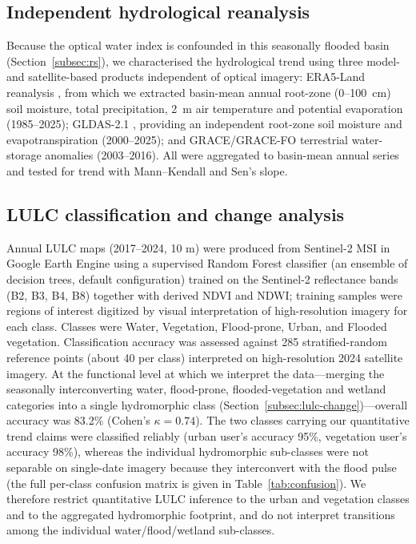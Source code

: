 \documentclass[preprint,authoryear,12pt]{elsarticle}
\begin{document}
\subsection{Independent hydrological reanalysis}
\label{subsec:hydro-data}
Because the optical water index is confounded in this seasonally flooded basin
(Section~\ref{subsec:rs}), we characterised the hydrological trend using three model- and
satellite-based products independent of optical imagery: ERA5-Land reanalysis
\citep{MunozSabater2021}, from which we extracted basin-mean annual root-zone (0--100~cm) soil
moisture, total precipitation, 2~m air temperature and potential evaporation (1985--2025);
GLDAS-2.1 \citep{Rodell2004}, providing an independent root-zone soil moisture and
evapotranspiration (2000--2025); and GRACE/GRACE-FO terrestrial water-storage anomalies
\citep{Tapley2004} (2003--2016). All were aggregated to basin-mean annual series and tested for
trend with Mann--Kendall and Sen's slope.

\subsection{LULC classification and change analysis}
\label{subsec:lulc}
Annual LULC maps (2017--2024, 10 m) were produced from Sentinel-2 MSI in Google Earth Engine
using a supervised Random Forest classifier (an ensemble of decision trees, default
configuration) trained on the Sentinel-2 reflectance bands (B2, B3, B4, B8) together with
derived NDVI and NDWI; training samples were regions of interest digitized by visual
interpretation of high-resolution imagery for each class. Classes were Water, Vegetation, Flood-prone, Urban,
and Flooded vegetation. Classification accuracy was assessed against 285 stratified-random
reference points (about 40 per class) interpreted on high-resolution 2024 satellite imagery.
At the functional level at which we interpret the data---merging the seasonally interconverting
water, flood-prone, flooded-vegetation and wetland categories into a single hydromorphic class
(Section~\ref{subsec:lulc-change})---overall accuracy was 83.2\% (Cohen's $\kappa=0.74$). The
two classes carrying our quantitative trend claims were classified reliably (urban user's
accuracy 95\%, vegetation user's accuracy 98\%), whereas the individual hydromorphic sub-classes
were not separable on single-date imagery because they interconvert with the flood pulse (the
full per-class confusion matrix is given in Table~\ref{tab:confusion}). We therefore restrict
quantitative LULC inference to the urban and vegetation classes and to the aggregated
hydromorphic footprint, and do not interpret transitions among the individual
water/flood/wetland sub-classes.
\end{document}
